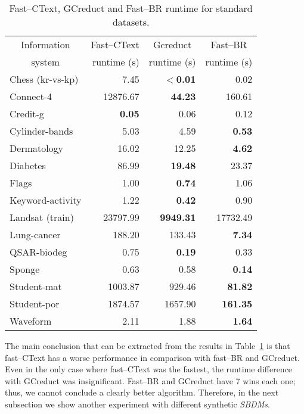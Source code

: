 \documentclass[authoryear,11pt]{elsarticle}
\begin{document}
\begin{table}[!htb]
	\centering
	\caption{Fast--CText, GCreduct and Fast--BR runtime for standard datasets.}
	\label{tab:java}
	\begin{tabular}{|l|r|r|r|}
		\hline
		\multicolumn{1}{|c|}{Information}  & Fast--CText & \multicolumn{1}{c|}{Gcreduct} & \multicolumn{1}{c|}{Fast--BR}  \\
		\multicolumn{1}{|c|}{system}       & runtime (s) & runtime (s)  & runtime (s)  \\
		\hline
		Chess (kr-vs-kp)          & 7.45          & \textbf{$<$0.01} & 0.02            \\
		Connect-4                 & 12876.67      & \textbf{44.23}   & 160.61          \\
		Credit-g                  & \textbf{0.05} & 0.06             & 0.12            \\
		Cylinder-bands            & 5.03          & 4.59             & \textbf{0.53}   \\
		Dermatology               & 16.02         & 12.25            & \textbf{4.62}   \\
		Diabetes                  & 86.99         & \textbf{19.48}   & 23.37           \\
		Flags                     & 1.00          & \textbf{0.74}    & 1.06            \\
		Keyword-activity          & 1.22          & \textbf{0.42}    & 0.90            \\
		Landsat (train)           & 23797.99      & \textbf{9949.31} & 17732.49        \\
		Lung-cancer               & 188.20        & 133.43           & \textbf{7.34}   \\
		QSAR-biodeg               & 0.75          & \textbf{0.19}    & 0.33            \\
		Sponge                    & 0.63          & 0.58             & \textbf{0.14}   \\
		Student-mat               & 1003.87       & 929.46           & \textbf{81.82}  \\
		Student-por               & 1874.57       & 1657.90          & \textbf{161.35} \\
		Waveform                  & 2.11          & 1.88             & \textbf{1.64}   \\
		\hline
	\end{tabular}
\end{table}

  The main conclusion that can be extracted from the results in Table~\ref{tab:java} is that fast--CText has a worse performance in comparison with fast--BR and GCreduct. Even in the only case where fast--CText was the fastest, the runtime difference with GCreduct was insignificant. Fast--BR and GCreduct have 7 wins each one; thus, we cannot conclude a clearly better algorithm. Therefore, in the next subsection we show another experiment with different synthetic \textit{SBDMs}.
\end{document}
